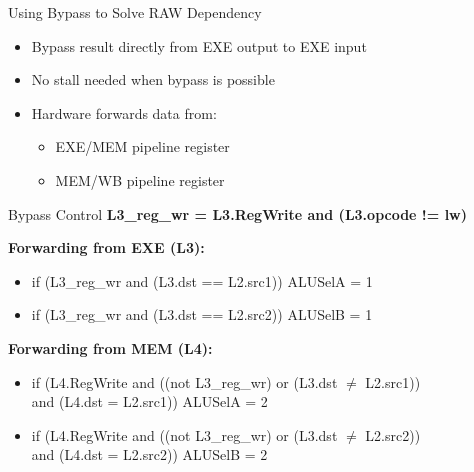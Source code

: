 \documentclass[aspectratio=169,12pt]{beamer}
\begin{document}
\begin{frame}{Using Bypass to Solve RAW Dependency}
    \begin{itemize}
        \item Bypass result directly from EXE output to EXE input
        \item No stall needed when bypass is possible
        \item Hardware forwards data from:
        \begin{itemize}
            \item EXE/MEM pipeline register
            \item MEM/WB pipeline register
        \end{itemize}
    \end{itemize}
    
    \centering
\end{frame}

\begin{frame}[fragile]{Bypass Control}
    \textbf{L3\_reg\_wr = L3.RegWrite and (L3.opcode != lw)}
    
    \vspace{0.3cm}
    \textbf{Forwarding from EXE (L3):}
    \begin{itemize}
        \item \small if (L3\_reg\_wr and (L3.dst == L2.src1)) ALUSelA = 1
        \item \small if (L3\_reg\_wr and (L3.dst == L2.src2)) ALUSelB = 1
    \end{itemize}
    
    \vspace{0.3cm}
    \textbf{Forwarding from MEM (L4):}
    \begin{itemize}
        \item \small if (L4.RegWrite and ((not L3\_reg\_wr) or (L3.dst $\neq$ L2.src1))\\
              and (L4.dst = L2.src1)) ALUSelA = 2
        \item \small if (L4.RegWrite and ((not L3\_reg\_wr) or (L3.dst $\neq$ L2.src2))\\
              and (L4.dst = L2.src2)) ALUSelB = 2
    \end{itemize}
\end{frame}
\end{document}

